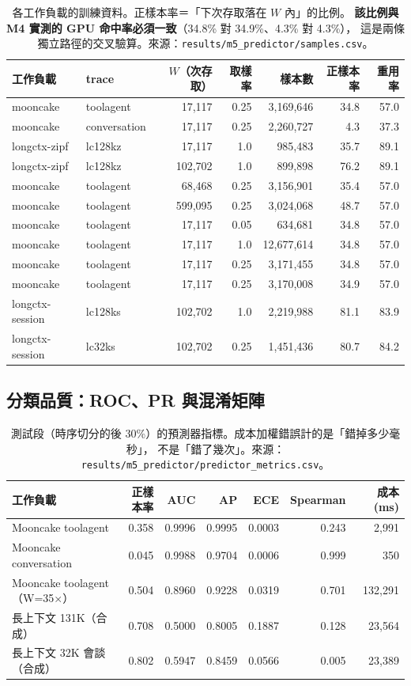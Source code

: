 \documentclass[11pt]{article}
\newcommand{\key}[1]{\textcolor{hlcol}{\textbf{#1}}}
\begin{document}
\begin{table}[htbp]\centering\small
\caption{各工作負載的訓練資料。正樣本率＝「下次存取落在 $W$ 內」的比例。
\key{該比例與 M4 實測的 GPU 命中率必須一致}（34.8\% 對 34.9\%、4.3\% 對 4.3\%），
這是兩條獨立路徑的交叉驗算。來源：\texttt{results/m5\_predictor/samples.csv}。}
\begin{tabular}{llrrrrr}
\toprule
工作負載 & trace & $W$（次存取） & 取樣率 & 樣本數 & 正樣本率 & 重用率 \\
\midrule
mooncake & toolagent & 17,117 & 0.25 & 3,169,646 & 34.8 & 57.0 \\
mooncake & conversation & 17,117 & 0.25 & 2,260,727 & 4.3 & 37.3 \\
longctx-zipf & lc128kz & 17,117 & 1.0 & 985,483 & 35.7 & 89.1 \\
longctx-zipf & lc128kz & 102,702 & 1.0 & 899,898 & 76.2 & 89.1 \\
mooncake & toolagent & 68,468 & 0.25 & 3,156,901 & 35.4 & 57.0 \\
mooncake & toolagent & 599,095 & 0.25 & 3,024,068 & 48.7 & 57.0 \\
mooncake & toolagent & 17,117 & 0.05 & 634,681 & 34.8 & 57.0 \\
mooncake & toolagent & 17,117 & 1.0 & 12,677,614 & 34.8 & 57.0 \\
mooncake & toolagent & 17,117 & 0.25 & 3,171,455 & 34.8 & 57.0 \\
mooncake & toolagent & 17,117 & 0.25 & 3,170,008 & 34.9 & 57.0 \\
longctx-session & lc128ks & 102,702 & 1.0 & 2,219,988 & 81.1 & 83.9 \\
longctx-session & lc32ks & 102,702 & 0.25 & 1,451,436 & 80.7 & 84.2 \\
\bottomrule
\end{tabular}
\end{table}

\subsection{分類品質：ROC、PR 與混淆矩陣}

\begin{table}[htbp]\centering\small
\caption{測試段（時序切分的後 30\%）的預測器指標。成本加權錯誤計的是「錯掉多少毫秒」，
不是「錯了幾次」。來源：\texttt{results/m5\_predictor/predictor\_metrics.csv}。}
\begin{tabular}{lrrrrrr}
\toprule
工作負載 & 正樣本率 & AUC & AP & ECE & Spearman & 成本 (ms) \\
\midrule
Mooncake toolagent & 0.358 & 0.9996 & 0.9995 & 0.0003 & 0.243 & 2,991 \\
Mooncake conversation & 0.045 & 0.9988 & 0.9704 & 0.0006 & 0.999 & 350 \\
Mooncake toolagent（W=35$\times$） & 0.504 & 0.8960 & 0.9228 & 0.0319 & 0.701 & 132,291 \\
長上下文 131K（合成） & 0.708 & 0.5000 & 0.8005 & 0.1887 & 0.128 & 23,564 \\
長上下文 32K 會談（合成） & 0.802 & 0.5947 & 0.8459 & 0.0566 & 0.005 & 23,389 \\
\bottomrule
\end{tabular}
\end{table}
\end{document}
